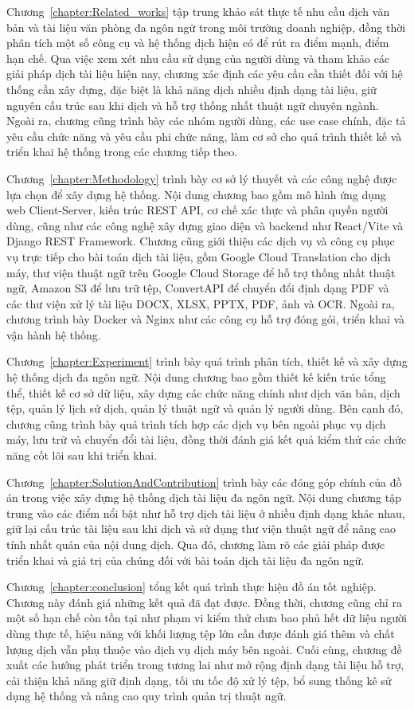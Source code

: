 \documentclass[../DoAn.tex]{subfiles}
\begin{document}
Chương~\ref{chapter:Related_works} tập trung khảo sát thực tế nhu cầu dịch văn bản và tài liệu văn phòng đa ngôn ngữ trong môi trường doanh nghiệp, đồng thời phân tích một số công cụ và hệ thống dịch hiện có để rút ra điểm mạnh, điểm hạn chế. Qua việc xem xét nhu cầu sử dụng của người dùng và tham khảo các giải pháp dịch tài liệu hiện nay, chương xác định các yêu cầu cần thiết đối với hệ thống cần xây dựng, đặc biệt là khả năng dịch nhiều định dạng tài liệu, giữ nguyên cấu trúc sau khi dịch và hỗ trợ thống nhất thuật ngữ chuyên ngành. Ngoài ra, chương cũng trình bày các nhóm người dùng, các use case chính, đặc tả yêu cầu chức năng và yêu cầu phi chức năng, làm cơ sở cho quá trình thiết kế và triển khai hệ thống trong các chương tiếp theo.

Chương~\ref{chapter:Methodology} trình bày cơ sở lý thuyết và các công nghệ được lựa chọn để xây dựng hệ thống. Nội dung chương bao gồm mô hình ứng dụng web Client-Server, kiến trúc REST API, cơ chế xác thực và phân quyền người dùng, cũng như các công nghệ xây dựng giao diện và backend như React/Vite và Django REST Framework. Chương cũng giới thiệu các dịch vụ và công cụ phục vụ trực tiếp cho bài toán dịch tài liệu, gồm Google Cloud Translation cho dịch máy, thư viện thuật ngữ trên Google Cloud Storage để hỗ trợ thống nhất thuật ngữ, Amazon S3 để lưu trữ tệp, ConvertAPI để chuyển đổi định dạng PDF và các thư viện xử lý tài liệu DOCX, XLSX, PPTX, PDF, ảnh và OCR. Ngoài ra, chương trình bày Docker và Nginx như các công cụ hỗ trợ đóng gói, triển khai và vận hành hệ thống.

Chương~\ref{chapter:Experiment} trình bày quá trình phân tích, thiết kế và xây dựng hệ thống dịch đa ngôn ngữ. Nội dung chương bao gồm thiết kế kiến trúc tổng thể, thiết kế cơ sở dữ liệu, xây dựng các chức năng chính như dịch văn bản, dịch tệp, quản lý lịch sử dịch, quản lý thuật ngữ và quản lý người dùng. Bên cạnh đó, chương cũng trình bày quá trình tích hợp các dịch vụ bên ngoài phục vụ dịch máy, lưu trữ và chuyển đổi tài liệu, đồng thời đánh giá kết quả kiểm thử các chức năng cốt lõi sau khi triển khai.

Chương~\ref{chapter:SolutionAndContribution} trình bày các đóng góp chính của đồ án trong việc xây dựng hệ thống dịch tài liệu đa ngôn ngữ. Nội dung chương tập trung vào các điểm nổi bật như hỗ trợ dịch tài liệu ở nhiều định dạng khác nhau, giữ lại cấu trúc tài liệu sau khi dịch và sử dụng thư viện thuật ngữ để nâng cao tính nhất quán của nội dung dịch. Qua đó, chương làm rõ các giải pháp được triển khai và giá trị của chúng đối với bài toán dịch tài liệu đa ngôn ngữ.

Chương~\ref{chapter:conclusion} tổng kết quá trình thực hiện đồ án tốt nghiệp. Chương này đánh giá những kết quả đã đạt được. Đồng thời, chương cũng chỉ ra một số hạn chế còn tồn tại như phạm vi kiểm thử chưa bao phủ hết dữ liệu người dùng thực tế, hiệu năng với khối lượng tệp lớn cần được đánh giá thêm và chất lượng dịch vẫn phụ thuộc vào dịch vụ dịch máy bên ngoài. Cuối cùng, chương đề xuất các hướng phát triển trong tương lai như mở rộng định dạng tài liệu hỗ trợ, cải thiện khả năng giữ định dạng, tối ưu tốc độ xử lý tệp, bổ sung thống kê sử dụng hệ thống và nâng cao quy trình quản trị thuật ngữ.
\end{document}
